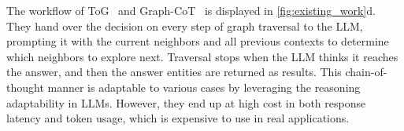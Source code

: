 The workflow of ToG~\cite{tog} and Graph-CoT~\cite{graphcot} is displayed in \autoref{fig:existing_work}d. They hand over the decision on every step of graph traversal to the LLM, prompting it with the current neighbors and all previous contexts to determine which neighbors to explore next. Traversal stops when the LLM thinks it reaches the answer, and then the answer entities are returned as results. This chain-of-thought manner is adaptable to various cases by leveraging the reasoning adaptability in LLMs. However, they end up at high cost in both response latency and token usage, which is expensive to use in real applications.
